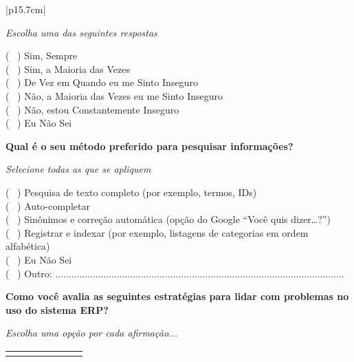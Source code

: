 \begin{longtable}{|p{15.7cm}|}
	\begin{Spacing}{2.0} 
		\tiny \textit{Escolha uma das seguintes respostas} \end{Spacing} 
	( \ ) Sim, Sempre \\
	( \ ) Sim, a Maioria das Vezes\\
	( \ ) De Vez em Quando eu me Sinto Inseguro\\
	( \ ) Não, a Maioria das Vezes eu me Sinto Inseguro\\
	( \ ) Não, estou Constantemente Inseguro\\
	( \ ) Eu Não Sei \\
	\begin{Spacing}{0.8} \end{Spacing}
	\begin{Spacing}{0.8} 
		\textbf{Qual é o seu método preferido para pesquisar informações?} \end{Spacing} 
	\begin{Spacing}{2.0} 
		\tiny \textit{Selecione todas as que se apliquem} \end{Spacing} 
	( \ ) Pesquisa de texto completo (por exemplo, termos, IDs) \\
	( \ ) Auto-completar \\
	( \ ) Sinônimos e correção automática (opção do Google “Você quis dizer…?”) \\
	( \ ) Registrar e indexar (por exemplo, listagens de categorias em ordem alfabética) \\
	( \ ) Eu Não Sei \\
	( \ ) Outro: \colorbox{white}{ ............................................................................................................ } \\
	\begin{Spacing}{0.8} \end{Spacing}
	\begin{Spacing}{0.8} 
		\textbf{Como você avalia as seguintes estratégias para lidar com problemas no uso do sistema ERP?} \end{Spacing} 
	\begin{Spacing}{2.0} 
		\tiny \textit{Escolha uma opção por cada afirmação...} \end{Spacing} 
	\begin{Spacing}{2.0} \end{Spacing}
	\tiny \begin{tabularx}{15.7 cm}{|X|X|X|X|X|X|X|}
		\hline
		& {\rotatebox[origin=c]{90}{\parbox[c]{2.5cm}{\centering \textcolor{white}{.}\newline \medskip Concordo Completamente}}} 

\end{tabularx}
\end{longtable}
